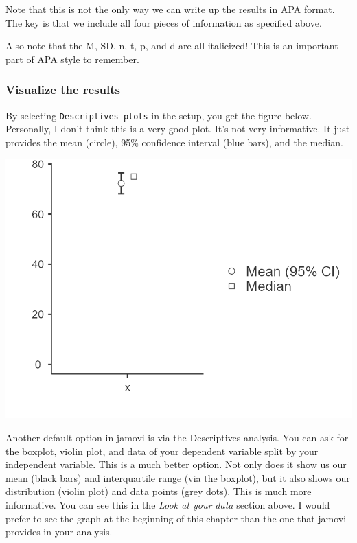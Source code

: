 \documentclass[
]{book}
\begin{document}
Note that this is not the only way we can write up the results in APA format. The key is that we include all four pieces of information as specified above.

Also note that the M, SD, n, t, p, and d are all italicized! This is an important part of APA style to remember.

\hypertarget{visualize-the-results}{%
\subsubsection{Visualize the results}\label{visualize-the-results}}

By selecting \texttt{Descriptives\ plots} in the setup, you get the figure below. Personally, I don't think this is a very good plot. It's not very informative. It just provides the mean (circle), 95\% confidence interval (blue bars), and the median.

\includegraphics{images/07.1-one_sample_t-test/results-plot.png}

Another default option in jamovi is via the Descriptives analysis. You can ask for the boxplot, violin plot, and data of your dependent variable split by your independent variable. This is a much better option. Not only does it show us our mean (black bars) and interquartile range (via the boxplot), but it also shows our distribution (violin plot) and data points (grey dots). This is much more informative. You can see this in the \emph{Look at your data} section above. I would prefer to see the graph at the beginning of this chapter than the one that jamovi provides in your analysis.
\end{document}
